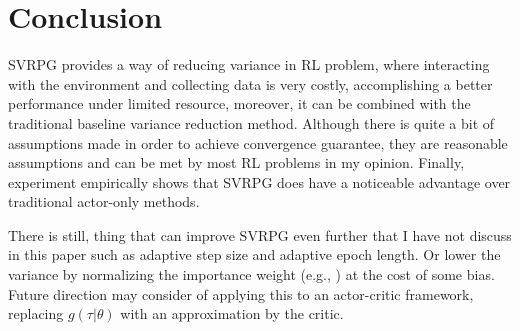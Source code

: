 \section{Conclusion}
\label{section:conclusion}
SVRPG provides a way of reducing variance in RL problem, where interacting with the environment and collecting data is very costly, accomplishing a better performance under limited resource, moreover, it can be combined with the traditional baseline variance reduction method. Although there is quite a bit of assumptions made in order to achieve convergence guarantee, they are reasonable assumptions and can be met by most RL problems in my opinion. Finally, experiment empirically shows that SVRPG does have a noticeable advantage over traditional actor-only methods.

There is still, thing that can improve SVRPG even further that I have not discuss in this paper such as adaptive step size and adaptive epoch length. Or lower the variance by normalizing the importance weight (e.g., \cite{tirinzoni2019transfer}) at the cost of some bias. Future direction may consider of applying this to an actor-critic framework, replacing $g(\tau|\theta)$ with an approximation by the critic.